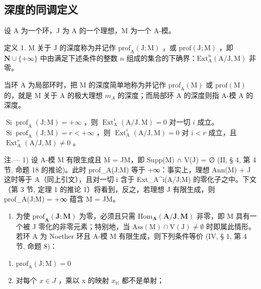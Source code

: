 \subsection{深度的同调定义}

设 A 为一个环，J 为 A 的一个理想，M 为一个 A-模。

定义 1. M 关于 J 的深度称为并记作 \(\mathrm{prof}_{\mathrm{A}}(\mathrm{J};\mathrm{M})\) ，或 \(\mathrm{prof}(\mathrm{J};\mathrm{M})\) ，即 \(\mathbf{N}\cup\{+\infty\}\) 中由满足下述条件的整数 \(n\) 组成的集合的下确界：\(\mathrm{Ext}_{\mathrm{A}}^{n}(\mathrm{A}/\mathrm{J},\mathrm{M})\) 非零。

当环 A 为局部环时，把 M 的深度简单地称为并记作 \(\text{prof}_{\mathrm{A}}(\mathrm{M})\) 或 \(\text{prof}(\mathrm{M})\) 的，就是 M 关于 A 的极大理想 \(m_{A}\) 的深度；而局部环 A 的深度则指 A-模 A 的深度。

\(\operatorname{Si} \operatorname{prof}_{\mathrm{A}}(\mathrm{J}; \mathrm{M}) = +\infty\) ，则 \(\operatorname{Ext}_{\mathrm{A}}^{i}(\mathrm{A}/\mathrm{J}, \mathrm{M}) = 0\) 对一切 \(i\) 成立。\(\operatorname{Si} \operatorname{prof}_{\mathrm{A}}(\mathrm{J}; \mathrm{M}) = r < +\infty\) ，则 \(\operatorname{Ext}_{\mathrm{A}}^{i}(\mathrm{A}/\mathrm{J}, \mathrm{M}) = 0\) 对 \(i < r\) 成立，且 \(\operatorname{Ext}_{\mathrm{A}}^{r}(\mathrm{A}/\mathrm{J}, \mathrm{M}) \neq 0\) 。

注.--- 1) 设 A-模 M 有限生成且 M = JM，即 Supp(M) ∩ V(J) = ∅ (II, § 4, 第 4 节, 命题 18 的推论)。此时 prof\_A(J;M) 等于 +∞：事实上，理想 Ann(M) + J 这时等于 A（同上引文），且对一切 i 含于 Ext\_A\^{}i(A/J;M) 的零化子之中。下文（第 3 节, 定理 1 的推论 1）将看到，反之，若理想 J 有限生成，则 prof\_A(J;M) = +∞ 蕴含 M = JM。

\begin{enumerate}
\def\labelenumi{\arabic{enumi})}
\setcounter{enumi}{1}
\tightlist
\item
  为使 \(\mathrm{prof}_{\mathbf{A}}(\mathbf{J};\mathbf{M})\) 为零，必须且只需 \(\mathrm{Hom}_{\mathbf{A}}(\mathbf{A} / \mathbf{J},\mathbf{M})\) 非零，即 M 具有一个被 J 零化的非零元素；特别地，当 \(\mathrm{Ass(M)}\cap \mathrm{V(J)}\neq \emptyset\) 时即属此情形。若环 A 为 Noether 环且 A-模 M 有限生成，则下列条件等价 (IV, § 1, 第 4 节, 命题 8)：
\end{enumerate}

\begin{enumerate}
\def\labelenumi{\alph{enumi})}
\item
  \(\mathrm{prof}_{\mathrm{A}}(\mathrm{J};\mathrm{M}) = 0\)
\item
  对每个 \(x \in J\) ，乘以 x 的映射 \(x_{\mathbb{M}}\) 都不是单射；
\end{enumerate}

